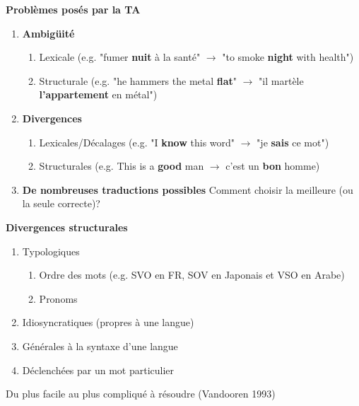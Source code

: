 \noindent\textbf{Problèmes posés par la TA}

\begin{enumerate}
    \item \textbf{Ambigüité}
    \begin{enumerate}
        \item Lexicale (e.g. "fumer \textbf{nuit} à la santé" $\rightarrow$ "to smoke \textbf{night} with health")
        \item Structurale (e.g. "he hammers the metal \textbf{flat}" $\rightarrow$ "il martèle \textbf{l'appartement} en métal")
    \end{enumerate}
    \item \textbf{Divergences}
    \begin{enumerate}
        \item Lexicales/Décalages (e.g. "I \textbf{know} this word" $\rightarrow$ "je \textbf{sais} ce mot")
        \item Structurales (e.g. This is a \textbf{good} man $\rightarrow$ c'est un \textbf{bon} homme)
    \end{enumerate}
    \item \textbf{De nombreuses traductions possibles}
        Comment choisir la meilleure (ou la seule correcte)?
\end{enumerate}

\noindent\textbf{Divergences structurales\\}

\begin{enumerate}
    \item Typologiques
    \begin{enumerate}
        \item Ordre des mots (e.g. SVO en FR, SOV en Japonais et VSO en Arabe)
        \item Pronoms
    \end{enumerate}
    \item Idiosyncratiques (propres à une langue)
    \item Générales à la syntaxe d'une langue
    \item Déclenchées par un mot particulier \\
\end{enumerate}

Du plus facile au plus compliqué à résoudre (Vandooren 1993) \\

